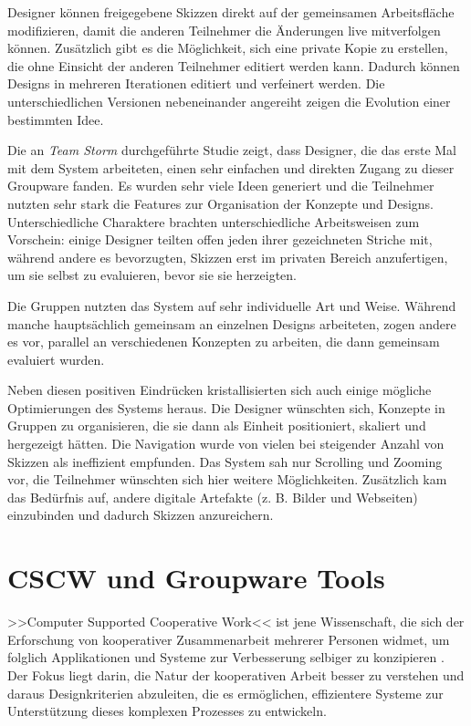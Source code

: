 Designer können freigegebene Skizzen direkt auf der gemeinsamen Arbeitsfläche modifizieren, damit die anderen Teilnehmer die Änderungen live mitverfolgen können. Zusätzlich gibt es die Möglichkeit, sich eine private Kopie zu erstellen, die ohne Einsicht der anderen Teilnehmer editiert werden kann. Dadurch können Designs in mehreren Iterationen editiert und verfeinert werden. Die unterschiedlichen Versionen nebeneinander angereiht zeigen die Evolution einer bestimmten Idee.

Die an \emph{Team Storm} durchgeführte Studie \citep{Hailpern:2007p113} zeigt, dass Designer, die das erste Mal mit dem System arbeiteten, einen sehr einfachen und direkten Zugang zu dieser Groupware fanden. Es wurden sehr viele Ideen generiert und die Teilnehmer nutzten sehr stark die Features zur Organisation der Konzepte und Designs. Unterschiedliche Charaktere brachten unterschiedliche Arbeitsweisen zum Vorschein: einige Designer teilten offen jeden ihrer gezeichneten Striche mit, während andere es bevorzugten, Skizzen erst im privaten Bereich anzufertigen, um sie selbst zu evaluieren, bevor sie sie herzeigten.

Die Gruppen nutzten das System auf sehr individuelle Art und Weise. Während manche hauptsächlich gemeinsam an einzelnen Designs arbeiteten, zogen andere es vor, parallel an verschiedenen Konzepten zu arbeiten, die dann gemeinsam evaluiert wurden.

Neben diesen positiven Eindrücken kristallisierten sich auch einige mögliche Optimierungen des Systems heraus. Die Designer wünschten sich, Konzepte in Gruppen zu organisieren, die sie dann als Einheit positioniert, skaliert und hergezeigt hätten. Die Navigation wurde von vielen bei steigender Anzahl von Skizzen als ineffizient empfunden. Das System sah nur Scrolling und Zooming vor, die Teilnehmer wünschten sich hier weitere Möglichkeiten. Zusätzlich kam das Bedürfnis auf, andere digitale Artefakte (z. B. Bilder und Webseiten) einzubinden und dadurch Skizzen anzureichern.

\section{CSCW und Groupware Tools} \label{sec:groupWareTools}
>>Computer Supported Cooperative Work<< ist jene Wissenschaft, die sich der Erforschung von kooperativer Zusammenarbeit mehrerer Personen widmet, um folglich Applikationen und Systeme zur Verbesserung selbiger zu konzipieren \citep{Bannon:1990p244}. Der Fokus liegt darin, die Natur der kooperativen Arbeit besser zu verstehen und daraus Designkriterien abzuleiten, die es ermöglichen, effizientere Systeme zur Unterstützung dieses komplexen Prozesses zu entwickeln. 

